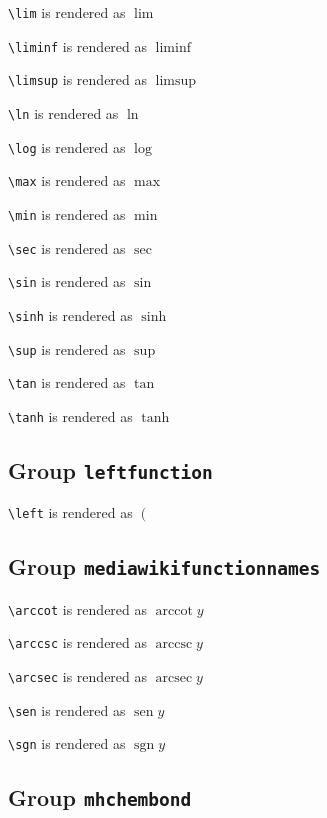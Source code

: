 \texttt{\textbackslash lim} is rendered as $\lim$

\texttt{\textbackslash liminf} is rendered as $\liminf$

\texttt{\textbackslash limsup} is rendered as $\limsup$

\texttt{\textbackslash ln} is rendered as $\ln$

\texttt{\textbackslash log} is rendered as $\log$

\texttt{\textbackslash max} is rendered as $\max$

\texttt{\textbackslash min} is rendered as $\min$

\texttt{\textbackslash sec} is rendered as $\sec$

\texttt{\textbackslash sin} is rendered as $\sin$

\texttt{\textbackslash sinh} is rendered as $\sinh$

\texttt{\textbackslash sup} is rendered as $\sup$

\texttt{\textbackslash tan} is rendered as $\tan$

\texttt{\textbackslash tanh} is rendered as $\tanh$

\subsection{ Group \texttt{left\textunderscore function}}

\texttt{\textbackslash left} is rendered as $\left( \right.$

\subsection{ Group \texttt{mediawiki\textunderscore function\textunderscore names}}

\texttt{\textbackslash arccot} is rendered as $\operatorname{arccot} y$

\texttt{\textbackslash arccsc} is rendered as $\operatorname{arccsc} y$

\texttt{\textbackslash arcsec} is rendered as $\operatorname{arcsec} y$

\texttt{\textbackslash sen} is rendered as $\operatorname{sen} y$

\texttt{\textbackslash sgn} is rendered as $\operatorname{sgn} y$

\subsection{ Group \texttt{mhchem\textunderscore bond}}

